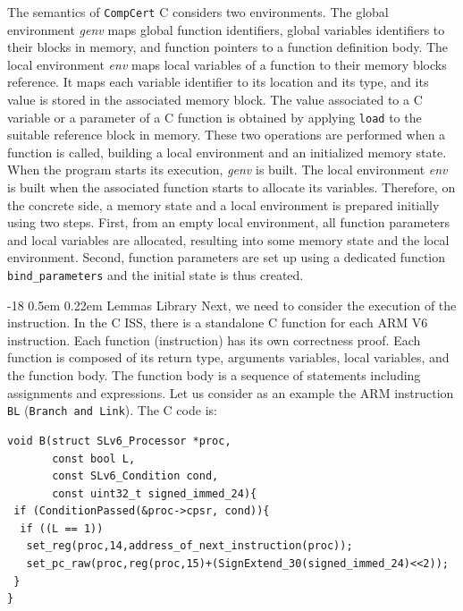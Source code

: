 \documentclass{llncs}
\makeatletter
\newcommand{\compcert}{\texttt{CompCert}\xspace}
\renewcommand\subsubsection{\@startsection{subsubsection}{3}{\z@}%
                       {-18\p@ \@plus -4\p@ \@minus -4\p@}%
                       {0.5em \@plus 0.22em}%
                       {\normalfont\normalsize\bfseries\boldmath}}
\makeatother
\begin{document}
The semantics of \compcert C considers two environments. The global
environment \emph{genv} maps global function identifiers, global
variables identifiers to their blocks in memory, and function pointers
to a function definition body.  The local environment \emph{env} maps
local variables of a function to their memory blocks reference.  It
maps each variable identifier to its location and its type, and its
value is stored in the associated memory block.  The value associated
to a C variable or a parameter of a C function is obtained by applying
\texttt{load} to the suitable reference block in memory.  These two
operations are performed when a function is called, building a local
environment and an initialized memory state. When the program starts
its execution, \emph{genv} is built.  The local environment \emph{env}
is built when the associated function starts to allocate its
variables. Therefore, on the concrete side, a memory state and a local
environment is prepared initially using two steps. First, from an
empty local environment, all function parameters and local variables
are allocated, resulting into some memory state and the local
environment. Second, function parameters are set up using a dedicated
function \texttt{bind\_parameters} and the initial state is thus
created.

\subsubsection{Lemmas Library}
Next, we need to consider the execution of the instruction.
In the C ISS, there is a standalone C function
for each ARM V6 instruction.  Each function (instruction) has its own
correctness proof.  Each function is composed of its return
type, arguments variables, local variables, and the function body. The
function body is a sequence of statements including assignments and
expressions. Let us consider as an example the ARM instruction
\texttt{BL} (\texttt{Branch and Link}). The C code is:
{\small
\begin{verbatim}
void B(struct SLv6_Processor *proc,
       const bool L,
       const SLv6_Condition cond,
       const uint32_t signed_immed_24){
 if (ConditionPassed(&proc->cpsr, cond)){
  if ((L == 1))
   set_reg(proc,14,address_of_next_instruction(proc));
   set_pc_raw(proc,reg(proc,15)+(SignExtend_30(signed_immed_24)<<2));
 }
}
\end{verbatim}
}
\end{document}
